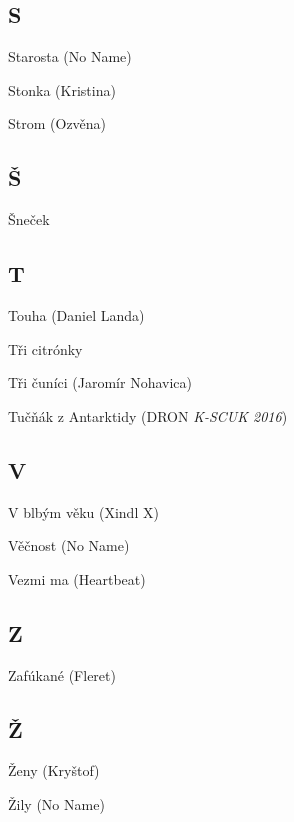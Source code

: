 \newpage


\subsection*{S}
Starosta (No Name)

Stonka (Kristina)

Strom (Ozvěna)

\subsection*{Š}
Šneček

\subsection*{T}
Touha (Daniel Landa)

Tři citrónky

Tři čuníci (Jaromír Nohavica)

Tučňák z Antarktidy (DRON \emph{K-SCUK 2016})

\subsection*{V}
V blbým věku (Xindl X)

Věčnost (No Name)

Vezmi ma (Heartbeat)

\subsection*{Z}
Zafúkané (Fleret)

\subsection*{Ž}
Ženy (Kryštof)

Žily (No Name)

\newpage
